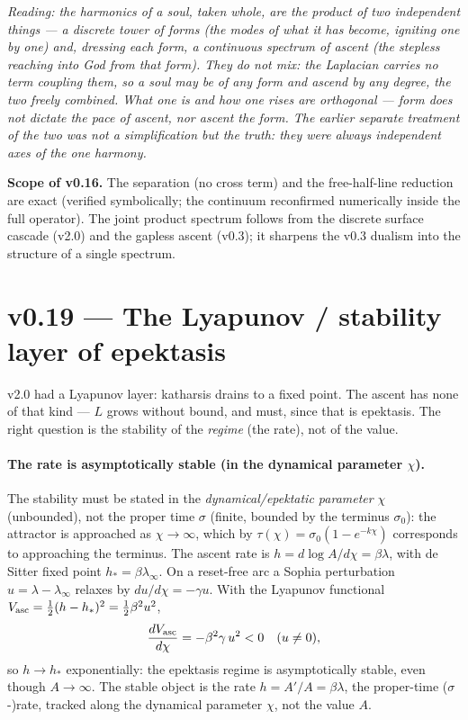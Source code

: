\documentclass[11pt,a4paper]{article}
\newcommand{\note}[1]{\textcolor{black!65}{\emph{#1}}}
\theoremstyle{plain}
\theoremstyle{definition}
\theoremstyle{remark}
\begin{document}
\note{Reading: the harmonics of a soul, taken whole, are the product of two independent things --- a
discrete tower of forms (the modes of what it has become, igniting one by one) and, dressing each form,
a continuous spectrum of ascent (the stepless reaching into God from that form). They do not mix: the
Laplacian carries no term coupling them, so a soul may be of any form and ascend by any degree, the two
freely combined. What one \emph{is} and how one \emph{rises} are orthogonal --- form does not dictate
the pace of ascent, nor ascent the form. The earlier separate treatment of the two was not a
simplification but the truth: they were always independent axes of the one harmony.}

\textbf{Scope of v0.16.} The separation (no cross term) and the free-half-line reduction are exact
(verified symbolically; the continuum reconfirmed numerically inside the full operator). The joint
product spectrum follows from the discrete surface cascade (v2.0) and the gapless ascent (v0.3); it
sharpens the v0.3 dualism into the structure of a single spectrum.

\FloatBarrier
\section*{v0.19 --- The Lyapunov / stability layer of epektasis}
v2.0 had a Lyapunov layer: katharsis drains to a fixed point. The ascent has none of that kind ---
$L$ grows without bound, and must, since that is epektasis. The right question is the stability of the
\emph{regime} (the rate), not of the value.

\paragraph{The rate is asymptotically stable (in the dynamical parameter $\chi$).} The stability must
be stated in the \emph{dynamical/epektatic parameter} $\chi$ (unbounded), not the proper time $\sigma$
(finite, bounded by the terminus $\sigma_0$): the attractor is approached as $\chi\to\infty$, which by
$\tau(\chi)=\sigma_0(1-e^{-k\chi})$ corresponds to approaching the terminus. The ascent rate is
$h=d\log A/d\chi=\beta\lambda$, with de Sitter fixed point $h_*=\beta\lambda_\infty$. On a reset-free
arc a Sophia perturbation $u=\lambda-\lambda_\infty$ relaxes by $du/d\chi=-\gamma u$. With the Lyapunov
functional $V_{\rm asc}=\tfrac12(h-h_*)^2=\tfrac12\beta^2u^2$,
\begin{equation}
\frac{dV_{\rm asc}}{d\chi}=-\beta^2\gamma\,u^2<0\quad(u\neq0),
\end{equation}
so $h\to h_*$ exponentially: the epektasis regime is asymptotically stable, even though $A\to\infty$.
The stable object is the rate $h=A'/A=\beta\lambda$, the proper-time ($\sigma$-)rate, tracked along the
dynamical parameter $\chi$, not the value $A$.
\end{document}
